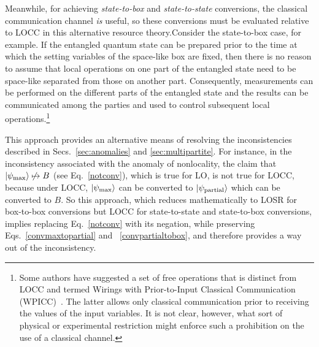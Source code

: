 \documentclass[prx,11pt,letterpaper,twocolumn,accepted=2023-11-27]{quantumarticle}
\newcommand{\rob}{\color{black}}
\newcommand{\blk}{\color{black}}
\newcommand{\ket}[1]{\left| #1 \right>}
\theoremstyle{plain}
\theoremstyle{definition}
\begin{document}
       
Meanwhile, for achieving {\em state-to-box} and {\em state-to-state} conversions, the classical communication channel {\em is} useful, so these conversions \rob must be evaluated relative to LOCC in this alternative resource theory.\blk Consider the state-to-box case, for example.  If the entangled quantum state can be prepared prior to the time at which the setting variables of the \rob space-like \blk box are fixed, then there is no reason to assume that local operations on one part of the entangled state need to be space-like separated from those on another part.  Consequently, measurements can be performed on the different parts of the entangled state and the results can be communicated among the parties and used to control subsequent local operations.\footnote{Some authors have suggested a set of free operations that is distinct from LOCC and termed Wirings with Prior-to-Input Classical Communication (WPICC)~\cite{WPICC}.  The latter allows only classical communication prior to receiving the values of the input variables.  It is not clear, however, what sort of physical or experimental restriction might enforce such a prohibition on the use of a classical channel.} 

This approach provides an alternative means of resolving 
 the inconsistencies described in Secs.~\ref{sec:anomalies} and \ref{sec:multipartite}.  
 For instance, in the inconsistency associated with the anomaly of nonlocality,
 the claim that $\ket{\psi_{\rm max}} \not\mapsto B$ (see Eq.~\eqref{notconv}), which is true for LO, is not true for LOCC, because under LOCC, $\ket{\psi_{\rm max}}$ can be converted to $\ket{\psi_{\rm partial}}$ which can be converted to $B$. So this approach, which reduces mathematically to LOSR for box-to-box conversions but LOCC for state-to-state and state-to-box conversions, implies replacing Eq.~\eqref{notconv} with its negation, while preserving Eqs.~\eqref{convmaxtopartial} and ~\eqref{convpartialtobox}, and therefore provides a
  way out of the inconsistency.
\end{document}

